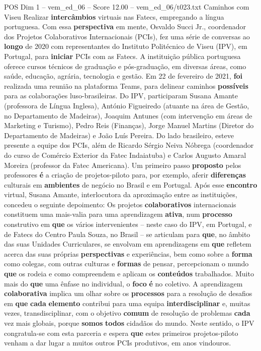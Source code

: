 \begin{textsample}{POS Dim 1 – vem\_ed\_06 – Score 12.00 – vem\_ed\_06/t023.txt}  \label{ex:f1_pos_127}
Caminhos com Viseu Realizar \textbf{intercâmbios} virtuais nas Fatecs, empregando a língua portuguesa.
Com essa \textbf{perspectiva} em mente, Osvaldo Succi Jr., coordenador dos Projetos Colaborativos Internacionais (PCIs), fez uma série de conversas ao \textbf{longo} de 2020 com representantes do Instituto Politécnico de Viseu (IPV), em Portugal, para \textbf{iniciar} PCIs com as Fatecs.
A instituição pública portuguesa oferece cursos técnicos de graduação e pós-graduação, em diversas áreas, como saúde, educação, agrária, tecnologia e gestão.
Em 22 de fevereiro de 2021, \textbf{foi} realizada uma reunião na plataforma Teams, para delinear caminhos \textbf{possíveis} para as colaborações luso-brasileiras.
Do IPV, participaram Susana Amante (professora de Língua Inglesa), António Figueiredo (atuante na área de Gestão, no Departamento de Madeiras), Joaquim Antunes (com intervenção em áreas de Marketing e Turismo), Pedro Reis (Finanças), Jorge Manuel Martins (Diretor do Departamento de Madeiras) e João Luís Pereira.
Do lado brasileiro, esteve presente a equipe dos PCIs, além de Ricardo Sérgio Neiva Nóbrega (coordenador do curso de Comércio Exterior da Fatec Indaiatuba) e Carlos Augusto Amaral Moreira (professor da Fatec Americana).
Um primeiro passo \textbf{proposto} pelos professores \textbf{é} a criação de projetos-piloto para, por exemplo, aferir \textbf{diferenças} culturais em \textbf{ambientes} de negócio no Brasil e em Portugal.
Após esse \textbf{encontro} virtual, Susana Amante, interlocutora da aproximação entre as instituições, concedeu o seguinte depoimento: Os projetos \textbf{colaborativos} internacionais constituem uma mais-valia para uma aprendizagem \textbf{ativa}, num \textbf{processo} construtivo em \textbf{que} os vários intervenientes – neste caso do IPV, em Portugal, e de Fatecs do Centro Paula Souza, no Brasil – se articulam para \textbf{que}, no âmbito das suas Unidades Curriculares, se envolvam em aprendizagens em \textbf{que} refletem acerca das suas próprias \textbf{perspectivas} e experiências, bem como sobre a \textbf{forma} como colegas, com outras culturas e \textbf{formas} de pensar, percepcionam o mundo \textbf{que} os rodeia e como compreendem e aplicam os \textbf{conteúdos} trabalhados.
Muito mais do \textbf{que} uma ênfase no individual, o \textbf{foco} \textbf{é} no coletivo.
A aprendizagem \textbf{colaborativa} implica um olhar sobre os \textbf{processos} para a resolução de desafios em \textbf{que} \textbf{cada} \textbf{elemento} contribui para uma equipa \textbf{interdisciplinar} e, muitas vezes, transdisciplinar, com o objetivo \textbf{comum} de resolução de problemas \textbf{cada} vez mais globais, porque \textbf{somos} \textbf{todos} cidadãos do mundo.
Neste sentido, o IPV congratula-se com esta parceria e espera \textbf{que} estes primeiros projetos-piloto venham a dar lugar a muitos outros PCIs produtivos, em anos vindouros.

\end{textsample}
